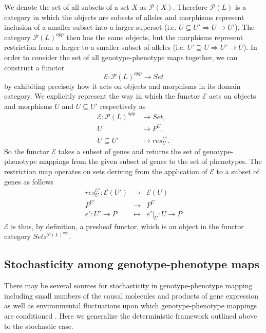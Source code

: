 \documentclass[10pt]{article}
\begin{document}
We denote the set of all subsets of a set $X$ as $\mathcal{P}(X)$. Therefore $\mathcal{P}(L)$ is a category in which the objects are subsets of alleles and morphisms represent inclusion of a smaller subset into a larger superset (i.e. $U \subseteq U' \Rightarrow U \rightarrow U'$). The category $\mathcal{P}(L)^{opp}$ then has the same objects, but the morphisms represent restriction from a larger to a smaller subset of alleles (i.e. $U' \supseteq U \Rightarrow U' \rightarrow U$). In order to consider the set of all genotype-phenotype maps together, we can construct a functor
$$
\mathcal{E} \colon \mathcal{P}(L)^{opp} \rightarrow Set
$$
by exhibiting precisely how it acts on objects and morphisms in its domain category. We explicitly represent the way in which the functor $\mathcal{E}$ acts on objects and morphisms $U$ and $U \subseteq U'$ respectively as
\begin{equation}\label{eq:gpfunctor}
\begin{split}
\mathcal{E} \colon \mathcal{P}(L)^{opp} &\rightarrow Set,\\
U &\mapsto P^U,\\
U \subseteq U' &\mapsto res^{U'}_{U}.
\end{split}
\end{equation}
So the functor $\mathcal{E}$ takes a subset of genes and returns the set of genotype-phenotype mappings from the given subset of genes to the set of phenotypes. The restriction map operates on sets deriving from the application of $\mathcal{E}$ to a subset of genes as follows
\begin{eqnarray*}
res^{U'}_{U} \colon \mathcal{E}(U') &\rightarrow& \mathcal{E}(U)\\
P^{U'} &\rightarrow& P^U\\
e' \colon U' \rightarrow P &\mapsto& e'|_U \colon U \rightarrow P
\end{eqnarray*}
$\mathcal{E}$ is thus, by definition, a presheaf functor, which is an object in the functor category $Sets^{\mathcal{P}(L)^{opp}}$.

\subsection*{Stochasticity among genotype-phenotype maps}
There may be several sources for stochasticity in genotype-phenotype mapping including small numbers of the causal molecules and products of gene expression as well as environmental fluctuations upon which genotype-phenotype mappings are conditioned \cite{Swain2002,Paulsson2004,Thattai2004,Acar2008a,Lestas2010,Munsky2012,Neuert2013}. Here we generalize the deterministic framework outlined above to the stochastic case.
\end{document}
